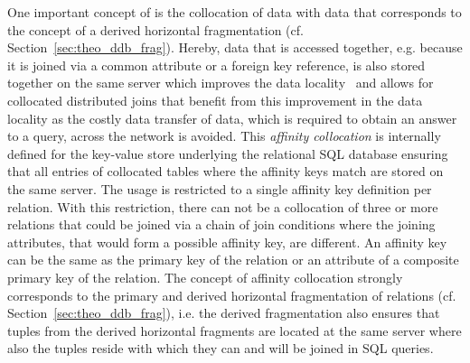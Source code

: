 One important concept of  is the collocation of data with data that corresponds to the concept of a derived horizontal fragmentation 
(cf. Section~\ref{sec:theo_ddb_frag}). Hereby, data that is accessed together, e.g. because it is joined via a common attribute or a foreign key reference,
is also stored together on the same server which improves the data locality~\citep{Wiese2014} and allows for collocated distributed joins that benefit from
this improvement in the data locality as the costly data transfer of data, which is required to obtain an answer to a query, across the network is 
avoided. This \emph{affinity collocation} is internally defined for the key-value store underlying the relational SQL database ensuring that all entries 
of collocated tables where the affinity keys match are stored on the same server. The usage is restricted to a single affinity key definition per 
relation. With this restriction, there can not be a collocation of three or more relations that could be joined via a chain of join conditions where the
joining attributes, that would form a possible affinity key, are different. An affinity key can be the same as the primary key of the relation or an 
attribute of a composite primary key of the relation. The concept of affinity collocation strongly corresponds to the primary and derived horizontal
fragmentation of relations (cf. Section~\ref{sec:theo_ddb_frag}), i.e. the derived fragmentation also ensures that tuples from the derived horizontal 
fragments are located at the same server where also the tuples reside with which they can and will be joined in SQL queries.

